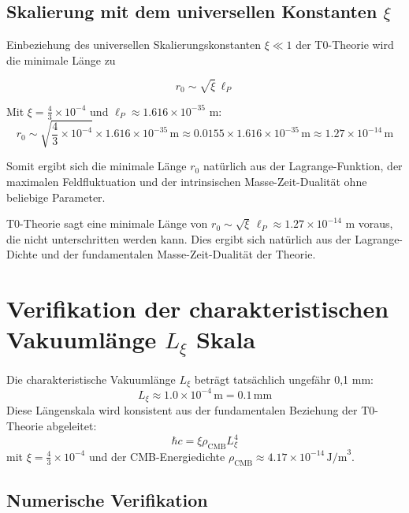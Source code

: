 \documentclass[12pt,a4paper]{article}
\numberwithin{equation}{section}
\begin{document}
	\subsection{Skalierung mit dem universellen Konstanten $\xi$}
	
	Einbeziehung des universellen Skalierungskonstanten $\xi \ll 1$ der T0-Theorie wird die minimale Länge zu
	
	\begin{equation}
		r_0 \sim \sqrt{\xi} \, \ell_P
	\end{equation}
	
	Mit $\xi = \frac{4}{3} \times 10^{-4}$ und $\ell_P \approx 1.616 \times 10^{-35}$ m:
	\[
	r_0 \sim \sqrt{\frac{4}{3} \times 10^{-4}} \times 1.616 \times 10^{-35}\,\text{m} \approx 0.0155 \times 1.616 \times 10^{-35}\,\text{m} \approx 1.27 \times 10^{-14}\,\text{m}
	\]
	
	Somit ergibt sich die minimale Länge $r_0$ natürlich aus der Lagrange-Funktion, der maximalen Feldfluktuation und der intrinsischen Masse-Zeit-Dualität ohne beliebige Parameter.
	
	\begin{revolutionaer}
		T0-Theorie sagt eine minimale Länge von $r_0 \sim \sqrt{\xi} \, \ell_P \approx 1.27 \times 10^{-14}$ m voraus, die nicht unterschritten werden kann. Dies ergibt sich natürlich aus der Lagrange-Dichte und der fundamentalen Masse-Zeit-Dualität der Theorie.
	\end{revolutionaer}
	
	\section*{Verifikation der charakteristischen Vakuumlänge $L_\xi$ Skala}
	
	\begin{wichtig}
		Die charakteristische Vakuumlänge $L_\xi$ beträgt tatsächlich ungefähr 0,1 mm:
		\[
		L_\xi \approx 1.0 \times 10^{-4}\,\text{m} = 0.1\,\text{mm}
		\]
		Diese Längenskala wird konsistent aus der fundamentalen Beziehung der T0-Theorie abgeleitet:
		\[
		\hbar c = \xi \rho_{\text{CMB}} L_\xi^4
		\]
		mit $\xi = \frac{4}{3} \times 10^{-4}$ und der CMB-Energiedichte $\rho_{\text{CMB}} \approx 4.17 \times 10^{-14}\,\text{J/m}^3$.
	\end{wichtig}
	
	\subsection*{Numerische Verifikation}
	
\end{document}
